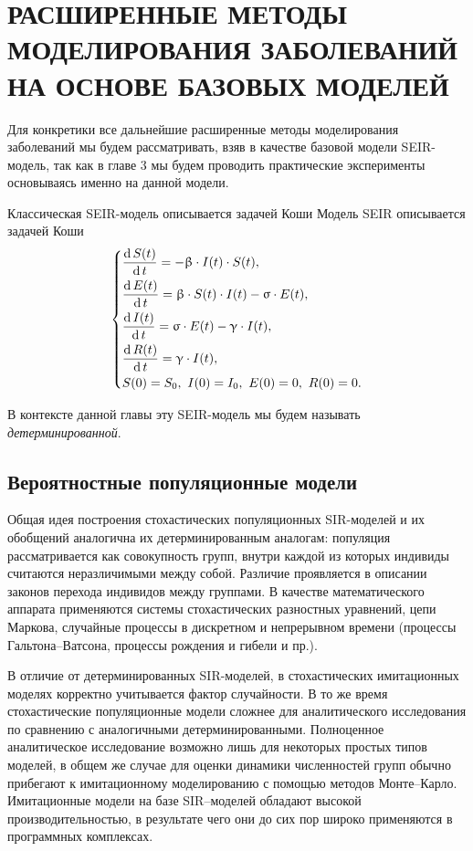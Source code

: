 \documentclass[a4paper, 14pt]{extreport}
\numberwithin{equation}{section}
\renewcommand{\beta}{\upbeta}
\renewcommand{\gamma}{\upgamma}
\renewcommand{\sigma}{\upsigma}
\renewcommand{\d}{\operatorname{d}}
\begin{document}
	
	\newpage
	\chapter{РАСШИРЕННЫЕ МЕТОДЫ МОДЕЛИРОВАНИЯ ЗАБОЛЕВАНИЙ НА ОСНОВЕ БАЗОВЫХ МОДЕЛЕЙ}
	Для конкретики все дальнейшие расширенные методы моделирования заболеваний мы будем рассматривать, взяв в качестве базовой модели SEIR-модель, так как в главе 3 мы будем проводить практические эксперименты основываясь именно на данной модели. 
	
	Классическая SEIR-модель описывается задачей Коши
	Модель SEIR описывается задачей Коши
	\begin{equation*}
		\begin{dcases}
			\dfrac {\d S(t)}{\d t} = - \beta \cdot I(t)\cdot S(t),\\
			\dfrac {\d E(t)}{\d t} = \beta \cdot S(t)\cdot I(t) - \sigma\cdot E(t),\\
			\dfrac{\d I(t)}{\d t} =\sigma \cdot E(t) - \gamma\cdot I(t),\\
			\dfrac{\d R(t)}{\d t} = \gamma\cdot I(t),\\
			S(0) = S_0,\ I(0) = I_0,\ E(0) = 0,\ R(0) = 0.
		\end{dcases}
	\end{equation*}
	
	В контексте данной главы эту SEIR-модель мы будем называть \textit{детерминированной}.
	\section{Вероятностные популяционные модели}
	Общая идея построения стохастических популяционных SIR-моделей и их обобщений аналогична их детерминированным аналогам:
	популяция рассматривается как совокупность групп, внутри каждой из которых
	индивиды считаются неразличимыми между собой. Различие проявляется в
	описании законов перехода индивидов между группами. В качестве
	математического аппарата применяются системы стохастических разностных
	уравнений, цепи Маркова, случайные процессы в дискретном и непрерывном
	времени (процессы Гальтона–Ватсона, процессы рождения и гибели и пр.). 
	
	В отличие от детерминированных SIR-моделей, в стохастических имитационных моделях корректно учитывается
	фактор случайности. В то же время стохастические популяционные модели
	сложнее для аналитического исследования по сравнению с аналогичными
	детерминированными. Полноценное аналитическое исследование возможно
	лишь для некоторых простых типов моделей, в общем же случае для оценки
	динамики численностей групп обычно прибегают к имитационному
	моделированию с помощью методов Монте–Карло. Имитационные модели на
	базе SIR–моделей обладают высокой производительностью, в результате чего
	они до сих пор широко применяются в программных комплексах.
	
\end{document}
